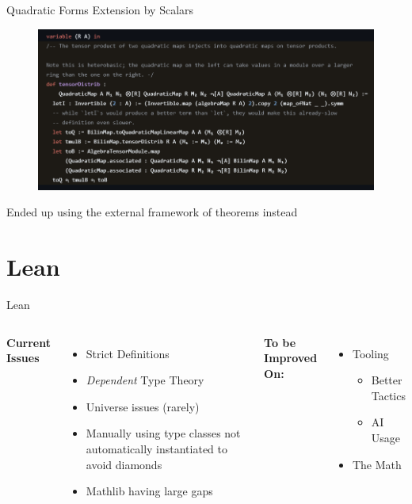 \documentclass[svgnames]{beamer}
\begin{document}
\begin{frame}{Quadratic Forms Extension by Scalars}

 \begin{figure}
    \centering
    \includegraphics[width=1\linewidth]{image8.png}
\end{figure}
\pause Ended up using the external framework of theorems instead
\end{frame}


\section{Lean}

\begin{frame}{Lean}

\vspace{1cm} 

\begin{columns}[t] 
  \textbf{Current Issues}
  \begin{itemize}[<+->]
    \item Strict Definitions
    \item \textit{Dependent} Type Theory
    \item Universe issues (rarely)
    \item Manually using type classes not automatically instantiated to avoid diamonds
    \item Mathlib having large gaps
  \end{itemize}
    
  \pause \textbf{To be Improved On:}
  \begin{itemize}[<+->]
      \item Tooling
      \begin{itemize}[<+->]
          \item Better Tactics
          \item AI Usage
      \end{itemize}
      \item The Math
  \end{itemize}
\end{columns}


\end{frame}
\end{document}
